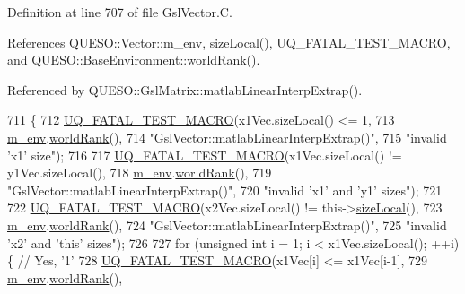 Definition at line 707 of file Gsl\-Vector.\-C.



References Q\-U\-E\-S\-O\-::\-Vector\-::m\-\_\-env, size\-Local(), U\-Q\-\_\-\-F\-A\-T\-A\-L\-\_\-\-T\-E\-S\-T\-\_\-\-M\-A\-C\-R\-O, and Q\-U\-E\-S\-O\-::\-Base\-Environment\-::world\-Rank().



Referenced by Q\-U\-E\-S\-O\-::\-Gsl\-Matrix\-::matlab\-Linear\-Interp\-Extrap().


\begin{DoxyCode}
711 \{
712   \hyperlink{_defines_8h_a56d63d18d0a6d45757de47fcc06f574d}{UQ\_FATAL\_TEST\_MACRO}(x1Vec.sizeLocal() <= 1,
713                       \hyperlink{class_q_u_e_s_o_1_1_vector_ae7615172bb1e54339151d3f3d71a0344}{m\_env}.\hyperlink{class_q_u_e_s_o_1_1_base_environment_a78b57112bbd0e6dd0e8afec00b40ffa7}{worldRank}(),
714                       \textcolor{stringliteral}{"GslVector::matlabLinearInterpExtrap()"},
715                       \textcolor{stringliteral}{"invalid 'x1' size"});
716 
717   \hyperlink{_defines_8h_a56d63d18d0a6d45757de47fcc06f574d}{UQ\_FATAL\_TEST\_MACRO}(x1Vec.sizeLocal() != y1Vec.sizeLocal(),
718                       \hyperlink{class_q_u_e_s_o_1_1_vector_ae7615172bb1e54339151d3f3d71a0344}{m\_env}.\hyperlink{class_q_u_e_s_o_1_1_base_environment_a78b57112bbd0e6dd0e8afec00b40ffa7}{worldRank}(),
719                       \textcolor{stringliteral}{"GslVector::matlabLinearInterpExtrap()"},
720                       \textcolor{stringliteral}{"invalid 'x1' and 'y1' sizes"});
721 
722   \hyperlink{_defines_8h_a56d63d18d0a6d45757de47fcc06f574d}{UQ\_FATAL\_TEST\_MACRO}(x2Vec.sizeLocal() != this->\hyperlink{class_q_u_e_s_o_1_1_gsl_vector_ace6fb1739b7cf6456b3dcde84c766fb3}{sizeLocal}(),
723                       \hyperlink{class_q_u_e_s_o_1_1_vector_ae7615172bb1e54339151d3f3d71a0344}{m\_env}.\hyperlink{class_q_u_e_s_o_1_1_base_environment_a78b57112bbd0e6dd0e8afec00b40ffa7}{worldRank}(),
724                       \textcolor{stringliteral}{"GslVector::matlabLinearInterpExtrap()"},
725                       \textcolor{stringliteral}{"invalid 'x2' and 'this' sizes"});
726 
727   \textcolor{keywordflow}{for} (\textcolor{keywordtype}{unsigned} \textcolor{keywordtype}{int} i = 1; i < x1Vec.sizeLocal(); ++i) \{ \textcolor{comment}{// Yes, '1'}
728     \hyperlink{_defines_8h_a56d63d18d0a6d45757de47fcc06f574d}{UQ\_FATAL\_TEST\_MACRO}(x1Vec[i] <= x1Vec[i-1],
729                         \hyperlink{class_q_u_e_s_o_1_1_vector_ae7615172bb1e54339151d3f3d71a0344}{m\_env}.\hyperlink{class_q_u_e_s_o_1_1_base_environment_a78b57112bbd0e6dd0e8afec00b40ffa7}{worldRank}(),

\end{DoxyCode}
